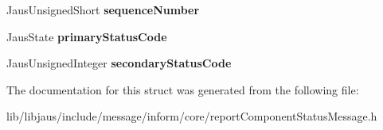\begin{DoxyCompactItemize}
\item 
\hypertarget{struct_report_component_status_message_struct_afa98e124c4cde5f6ab5c87473486eeb7}{\-Jaus\-Unsigned\-Short {\bfseries sequence\-Number}}\label{struct_report_component_status_message_struct_afa98e124c4cde5f6ab5c87473486eeb7}

\item 
\hypertarget{struct_report_component_status_message_struct_ab4d2273b321cb635a30d55ee223dbe2b}{\-Jaus\-State {\bfseries primary\-Status\-Code}}\label{struct_report_component_status_message_struct_ab4d2273b321cb635a30d55ee223dbe2b}

\item 
\hypertarget{struct_report_component_status_message_struct_a8f57dcc81d871a48a6e3d775c8a33ddb}{\-Jaus\-Unsigned\-Integer {\bfseries secondary\-Status\-Code}}\label{struct_report_component_status_message_struct_a8f57dcc81d871a48a6e3d775c8a33ddb}

\end{DoxyCompactItemize}


\-The documentation for this struct was generated from the following file\-:\begin{DoxyCompactItemize}
\item 
lib/libjaus/include/message/inform/core/report\-Component\-Status\-Message.\-h\end{DoxyCompactItemize}
